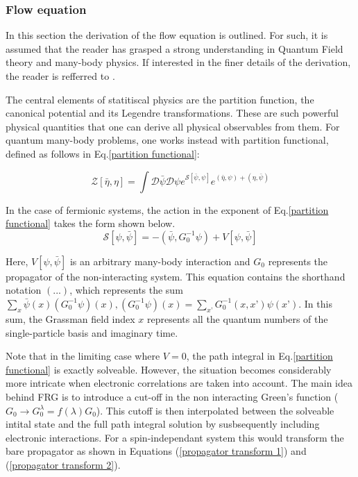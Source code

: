 \documentclass[12pt]{article}
\begin{document}
\subsubsection{Flow equation}
\label{subsubsec:Flow Equation}

In this section the derivation of the flow equation is outlined. For such, it is assumed that the reader has grasped a strong understanding in Quantum Field theory and many-body physics.
If interested in the finer details of the derivation, the reader is refferred to \cite{metzner2012functional}. \par
\medskip
\noindent The central elements of statitiscal physics are the partition function, the canonical potential and its Legendre transformations. 
These are such powerful physical quantities that one can derive all physical observables from them.
For quantum many-body problems, one works instead with partition functional, defined as follows in Eq.\ref{partition functional}:

\begin{equation}\label{partition functional}
    \mathcal{Z}[\bar{\eta}, \eta] = \int \mathcal{D} \bar{\psi} \mathcal{D}\psi e^{\mathcal{S}[\bar{\psi}, \psi]}e^{(\bar{\eta}, \psi)+(\eta, \bar{\psi})}
\end{equation}

\noindent In the case of fermionic systems, the action in the exponent of Eq.\ref{partition functional} takes the form shown below.
\begin{equation} \label{action}
    \mathcal{S}[\psi, \bar{\psi}] = -(\bar{\psi}, G_0^{-1} \psi) + V[\psi, \bar{\psi}]
\end{equation}

\noindent Here, $V[\psi, \bar{\psi}]$ is an arbitrary many-body interaction and $G_0$ represents the propagator of the non-interacting system. This equation contains the shorthand notation $(...)$, which represents the sum $\sum_x \bar{\psi}(x)(G_0^{-1}\psi)(x), (G_0^{-1}\psi)(x) = \sum_{x’}G_0^{-1}(x,x’)\psi(x’)$. In this sum, the Grassman field index $x$ represents all the quantum numbers of the single-particle basis and imaginary time.\par
\medskip

\noindent Note that in the limiting case where $V=0$, the path integral in Eq.\ref{partition functional} is exactly solveable. 
However, the situation becomes considerably more intricate when electronic correlations are taken into account.
The main idea behind FRG is to introduce a cut-off in the non interacting Green's function ($G_0 \rightarrow G_0^{\lambda} = f(\lambda)G_0$). 
This cutoff is then interpolated between the solveable intital state and the full path integral solution by susbsequently including electronic interactions. For a spin-independant system this would transform the 
bare propagator as shown in Equations (\ref{propagator transform 1}) and (\ref{propagator transform 2}). 
\end{document}
